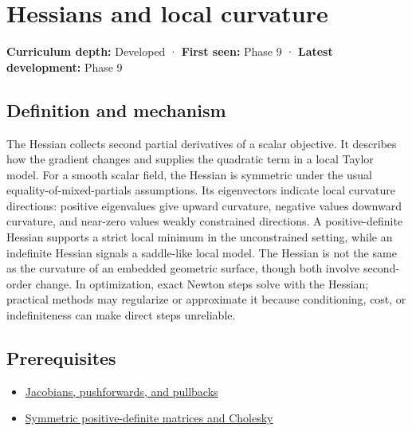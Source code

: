 \hypertarget{appendix-6ac071f8b50c}{}\label{referencestart:appendix-6ac071f8b50c}
\section{Hessians and local curvature}\label{appendix-6ac071f8b50c-hessians-and-local-curvature}

\hypertarget{appendix-6ac071f8b50c-hessians-and-local-curvature}{}

\textbf{Curriculum depth:} Developed · \textbf{First seen:} Phase 9 · \textbf{Latest development:} Phase 9

\begin{allmightroledefinition}

\subsection{Definition and mechanism}\label{appendix-6ac071f8b50c-definition-and-mechanism}

\hypertarget{appendix-6ac071f8b50c-definition-and-mechanism}{}

The Hessian collects second partial derivatives of a scalar objective. It describes how the gradient changes and supplies the quadratic term in a local Taylor model. For a smooth scalar field, the Hessian is symmetric under the usual equality-of-mixed-partials assumptions. Its eigenvectors indicate local curvature directions: positive eigenvalues give upward curvature, negative values downward curvature, and near-zero values weakly constrained directions. A positive-definite Hessian supports a strict local minimum in the unconstrained setting, while an indefinite Hessian signals a saddle-like local model. The Hessian is not the same as the curvature of an embedded geometric surface, though both involve second-order change. In optimization, exact Newton steps solve with the Hessian; practical methods may regularize or approximate it because conditioning, cost, or indefiniteness can make direct steps unreliable.

\end{allmightroledefinition}

\subsection{Prerequisites}\label{appendix-6ac071f8b50c-prerequisites}

\hypertarget{appendix-6ac071f8b50c-prerequisites}{}

\begin{itemize}
\tightlist
\item
  \hyperref[appendix-d8a7ddb675eb]{Jacobians, pushforwards, and pullbacks}
\item
  \hyperref[appendix-50d2ea3c9b26]{Symmetric positive-definite matrices and Cholesky}
\end{itemize}

